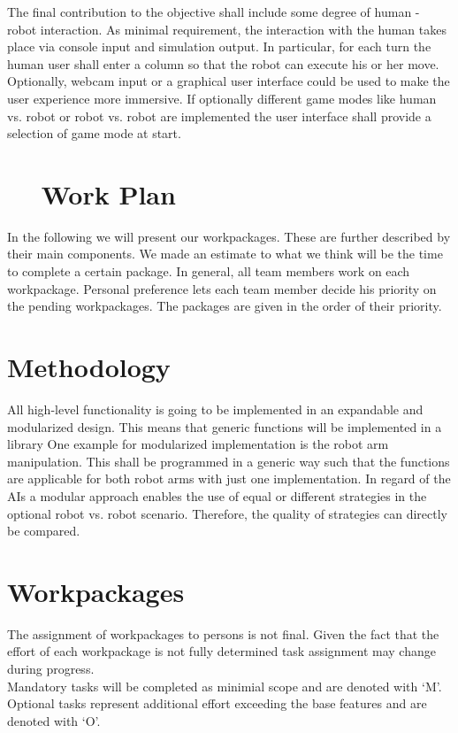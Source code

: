 \documentclass[11pt,pdftex,a4paper]{article}
\newcounter{exnum}
\newcommand{\ex}[1]{\section*{\theexnum $\quad$ #1 \stepcounter{exnum}}}
\begin{document}
	The final contribution to the objective shall include some degree of human - robot interaction.
	As minimal requirement, the interaction with the human takes place via console input and simulation output. 
	In particular, for each turn the human user shall enter a column so that the robot can execute his or her move. 
	Optionally, webcam input or a graphical user interface could be used to make the user experience more immersive. 
	If optionally different game modes like human vs. robot or robot vs. robot are implemented the user interface shall provide a selection of game mode at start.

   
	\ex{Work Plan}
	In the following we will present our workpackages.
	These are further described by their main components.
	We made an estimate to what we think will be the time to complete a certain package.
	In general, all team members work on each workpackage.
	Personal preference lets each team member decide his priority on the pending workpackages.
	The packages are given in the order of their priority.

	\section*{Methodology}
	All high-level functionality is going to be implemented in an expandable and modularized design.
	This means that generic functions will be implemented in a library
	One example for modularized implementation is the robot arm manipulation. 
	This shall be programmed in a generic way such that the functions are applicable for both robot arms with just one implementation.
	In regard of the AIs a modular approach enables the use of equal or different strategies in the optional robot vs. robot scenario.
	Therefore, the quality of strategies can directly be compared.

	\section*{Workpackages}
	The assignment of workpackages to persons is not final. 
	Given the fact that the effort of each workpackage is not fully determined task assignment may change during progress.\\
	Mandatory tasks will be completed as minimial scope and are denoted with `M'.\\
	Optional tasks represent additional effort exceeding the base features and are denoted with `O'.
	\\
\end{document}
